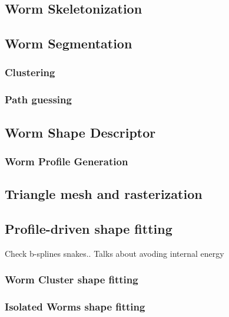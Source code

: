 \subsection{Worm Skeletonization}
\label{sec:metsk}

\subsection{Worm Segmentation}
\label{sec:metcluster}

\subsubsection{Clustering}
\label{sec:metcluster}
\subsubsection{Path guessing}

\subsection{Worm Shape Descriptor}
\label{sec:metshapedescriptor}

\subsubsection{Worm Profile Generation}
\label{sec:metwormprof}

\subsection{Triangle mesh and rasterization}
\label{sec:metrast}

\subsection{Profile-driven shape fitting}
\label{sec:metfit}

Check b-splines snakes.. Talks about avoding internal energy

\subsubsection{Worm Cluster shape fitting}
\subsubsection{Isolated Worms shape fitting}
\label{sec:metiso}